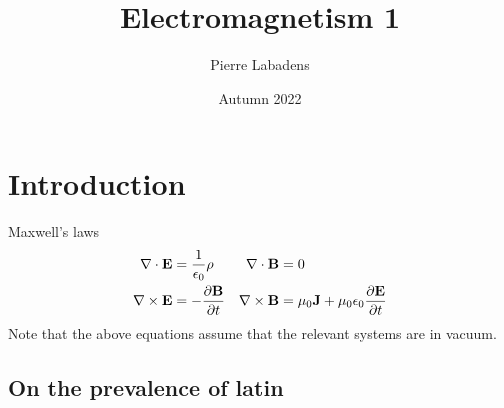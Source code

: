 \documentclass[twocolumn]{mynotes}
\title{Electromagnetism 1}
\author{Pierre Labadens}
\date{Autumn 2022}
\newcommand{\epz}{\ensuremath{\epsilon_{0}}}
\newcommand{\muz}{\ensuremath{\mu_{0}}}
\begin{document}
  \maketitle

  \tableofcontents

  \section{Introduction}

  \lipsum[1]

  \begin{titlebox}{Maxwell's laws}
    \begin{align*}
      \vv{\nabla}\cdot\vv{E} &= \frac{1}{\epz}\rho & \vv{\nabla}\cdot\vv{B} &= 0 \\
      \vv{\nabla}\times\vv{E} &= -\pd{\vv{B}}{t} & \vv{\nabla}\times\vv{B} &= \muz\vv{J} + \muz\epz\pd{\vv{E}}{t}
    \end{align*}
    Note that the above equations assume that the relevant systems are in vacuum.
  \end{titlebox}

  \subsection{On the prevalence of latin}

  \lipsum
\end{document}
